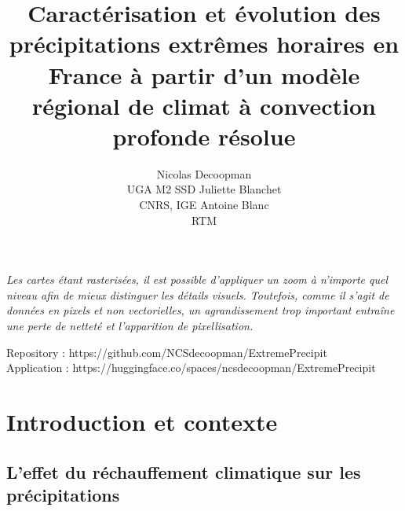 \documentclass[
  article,
  nofooter,
  noheadings]{jss}
\author{Nicolas Decoopman\\UGA M2 SSD \And Juliette Blanchet\\CNRS,
IGE \And Antoine Blanc\\RTM}
\title{Caractérisation et évolution des précipitations extrêmes horaires
en France à partir d'un modèle régional de climat à convection profonde
résolue}
\begin{document}
\maketitle


\emph{Les cartes étant rasterisées, il est possible d'appliquer un zoom
à n'importe quel niveau afin de mieux distinguer les détails visuels.
Toutefois, comme il s'agit de données en pixels et non vectorielles, un
agrandissement trop important entraîne une perte de netteté et
l'apparition de pixellisation.}

\small Repository : https://github.com/NCSdecoopman/ExtremePrecipit\\
\small Application :
https://huggingface.co/spaces/ncsdecoopman/ExtremePrecipit

\newpage

\section{Introduction et contexte}\label{introduction-et-contexte}

\subsection{L'effet du réchauffement climatique sur les
précipitations}\label{leffet-du-ruxe9chauffement-climatique-sur-les-pruxe9cipitations}
\end{document}
